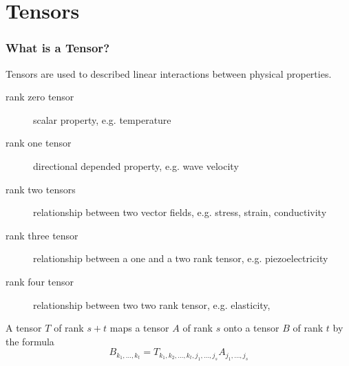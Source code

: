 
\section{Tensors}


\begin{frame}
  \frametitle{What is a Tensor?}

  Tensors are used to described linear interactions between physical
  properties.

  \pause

  \begin{description}
    \item[rank zero tensor] scalar property, e.g. temperature
    \item[rank one tensor] directional depended property, e.g. wave velocity
    \item[rank two tensors] relationship between two vector fields,
    e.g. stress, strain, conductivity
    \item[rank three tensor] relationship between a one and a two rank tensor,
    e.g. piezoelectricity
    \item[rank four tensor] relationship between two two rank tensor, e.g. elasticity,
  \end{description}

  \pause

  A tensor $T$ of rank $s+t$ maps a tensor $A$ of rank $s$ onto a tensor $B$
  of rank $t$ by the formula
  \begin{equation*}
    B_{k_{1},\ldots,k_{t}}
    = T_{k_{1},k_{2},\ldots,k_{t},j_{1},\ldots,j_{s}} A_{j_{1},\ldots,j_{s}}
  \end{equation*}

\end{frame}


